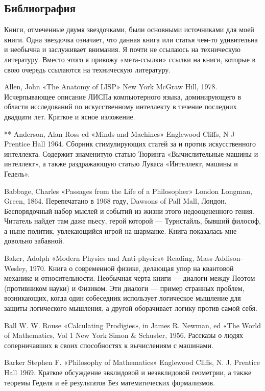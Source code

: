 \subsection{Библиография}

Книги, отмеченные двумя звездочками, были основными источниками для моей книги. Одна звездочка означает, что данная книга или статья чем-то удивительна и необычна и заслуживает внимания. Я почти не ссылаюсь на техническую литературу. Вместо этого я привожу «мета-ссылки» ссылки на книги, которые в свою очередь ссылаются на техническую литературу.

Allen, John «The Anatomy of LISP» New York McGraw Hill, 1978. Исчерпывающее описание ЛИСПа компьютерного языка, доминирующего в области исследований по искусственному интеллекту в течение последних двадцати лет. Краткое и ясное изложение.

** Anderson, Alan Ross ed «Minds and Machines» Englewood Cliffs, N J Prentice Hall 1964. Сборник стимулирующих статей за и против искусственного интеллекта. Содержит знаменитую статью Тюринга «Вычислительные машины и интеллект», а также раздражающую статью Лукаса «Интеллект, машины и Гедель».

Babbage, Charles «Passages from the Life of a Philosopher» London Longman, Green, 1864. Перепечатано в 1968 году, Dawsons of Pall Mall, Лондон. Беспорядочный набор мыслей и событий из жизни этого недооцененного гения. Читатель найдет там даже пьесу, герой которой --- Турнстайль, бывший философ, а ныне политик, увлекающийся игрой на шарманке. Книга показалась мне довольно забавной.

Baker, Adolph «Modern Physics and Anti-physics» Reading, Mass Addison-Wesley, 1970. Книга о современной физике, делающая упор на квантовой механике и относительности. Необычная черта книги --- диалоги между Поэтом (противником науки) и Физиком. Эти диалоги --- пример странных проблем, возникающих, когда один собеседник использует логическое мышление для защиты логического мышления, а другой оборачивает логику против самой себя.

Ball W. W. Rouse «Calculating Prodigies», in James R. Newman, ed «The World of Mathematics, Vol 1 New York Simon \& Schuster, 1956. Рассказы о людях соперничавших в своих способностях к вычислениям с машинами.

Barker Stephen F. «Philosophy of Mathematics» Englewood Cliffs, N. J. Prentice Hall 1969. Краткое обсуждение эвклидовой и неэвклидовой геометрии, а также теоремы Геделя и её результатов Без математических формализмов.

